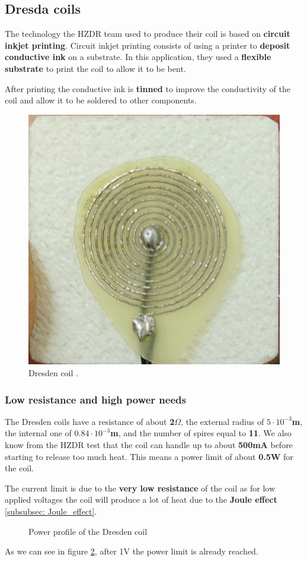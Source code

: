 \subsection{Dresda coils}
The technology the HZDR team used to produce their coil is based on \textbf{circuit inkjet printing}.
Circuit inkjet printing consists of using a printer to \textbf{deposit conductive ink} on a substrate.
In this application, they used a \textbf{flexible substrate} to print the coil to allow it to be bent.

\begin{samepage}
    After printing the conductive ink is \textbf{tinned} to improve the conductivity of the coil and allow it to be soldered to other components.
    \nopagebreak

    \begin{figure}[H]
        \centering
        \includegraphics[width=0.4\linewidth]{Chapters/Chapter5/Coils_alternatives/Figures/Dresden_coil.jpg}
        \caption[Dresden coil.]{Dresden coil \cite{HZDR}.}
        \label{fig: Dresden_coil} 
    \end{figure}
\end{samepage}


\subsubsection{Low resistance and high power needs}
The Dresden coils have a resistance of about \textbf{2$\Omega$}, the external radius of \textbf{$5\cdot10^{-3}$m}, the internal one of \textbf{$0.84\cdot10^{-3}$m}, and the number of spires equal to \textbf{11}.
We also know from the HZDR test that the coil can handle up to about \textbf{500mA} before starting to release too much heat.
This means a power limit of about \textbf{0.5W} for the coil.

\begin{samepage}
    The current limit is due to the \textbf{very low resistance} of the coil as for low applied voltages the coil will produce a lot of heat due to the \textbf{Joule effect} \ref{subsubsec: Joule_effect}.

    \begin{figure}[H]
        \centering
        \resizebox{0.5\textwidth}{!}{
            
        }
        \caption{Power profile of the Dresden coil}
        \label{fig: Dresden_heat_graph}
    \end{figure}
    As we can see in figure \ref{fig: Dresden_heat_graph}, after 1V the power limit is already reached.
\end{samepage}


